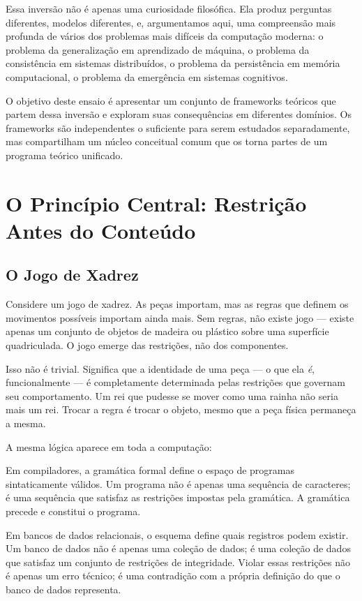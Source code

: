 \documentclass[11pt, a4paper]{article}
\theoremstyle{named}
\begin{document}
Essa inversão não é apenas uma curiosidade filosófica. Ela produz
perguntas diferentes, modelos diferentes, e, argumentamos aqui, uma
compreensão mais profunda de vários dos problemas mais difíceis da
computação moderna: o problema da generalização em aprendizado de
máquina, o problema da consistência em sistemas distribuídos, o problema
da persistência em memória computacional, o problema da emergência em
sistemas cognitivos.

O objetivo deste ensaio é apresentar um conjunto de frameworks
teóricos que partem dessa inversão e exploram suas consequências em
diferentes domínios. Os frameworks são independentes o suficiente para
serem estudados separadamente, mas compartilham um núcleo conceitual
comum que os torna partes de um programa teórico unificado.

\section{O Princípio Central: Restrição Antes do Conteúdo}

\subsection{O Jogo de Xadrez}

Considere um jogo de xadrez. As peças importam, mas as regras que
definem os movimentos possíveis importam ainda mais. Sem regras, não
existe jogo — existe apenas um conjunto de objetos de madeira ou
plástico sobre uma superfície quadriculada. O jogo emerge das restrições,
não dos componentes.

Isso não é trivial. Significa que a identidade de uma peça — o que ela
\emph{é}, funcionalmente — é completamente determinada pelas restrições
que governam seu comportamento. Um rei que pudesse se mover como uma
rainha não seria mais um rei. Trocar a regra é trocar o objeto, mesmo
que a peça física permaneça a mesma.

A mesma lógica aparece em toda a computação:

Em compiladores, a gramática formal define o espaço de programas
sintaticamente válidos. Um programa não é apenas uma sequência de
caracteres; é uma sequência que satisfaz as restrições impostas pela
gramática. A gramática precede e constitui o programa.

Em bancos de dados relacionais, o esquema define quais registros podem
existir. Um banco de dados não é apenas uma coleção de dados; é uma
coleção de dados que satisfaz um conjunto de restrições de integridade.
Violar essas restrições não é apenas um erro técnico; é uma contradição
com a própria definição do que o banco de dados representa.
\end{document}

